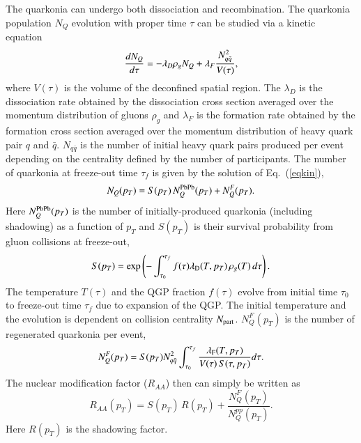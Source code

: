 {\color{black}
  The quarkonia can undergo both dissociation and recombination.
 The quarkonia population $N_{Q}$ evolution with proper time $\tau$ can be studied via
a kinetic equation~\cite{Thews:2000rj}
  \begin{equation}\label{eqkin}
    {dN_{Q} \over d\tau}  =  - \lambda_D  \rho_g N_{Q} + \lambda_F {N_{q \bar{q}}^{2} \over V(\tau)},
  \end{equation}
  where $V(\tau)$ is the volume of the deconfined spatial region.
The $\lambda_{D}$ is the dissociation rate obtained by the dissociation cross section averaged over 
the momentum distribution of gluons $\rho_g$ and $\lambda_{F}$ is the formation
rate obtained by the formation cross section 
averaged over the momentum distribution of heavy quark pair $q$ and $\bar{q}$. 
$N_{q \bar{q}}$ is the number of initial heavy quark pairs produced per event depending on the
centrality defined by the number of participants.
  The number of quarkonia at freeze-out time $\tau_f$ is given by the solution of Eq.~(\ref{eqkin}),
  \begin{equation}
    N_{Q}(p_T) = S(p_T) \,N_{Q}^{\rm PbPb}(p_T)+N_{Q}^F(p_T).
    \label{eqbeta}
  \end{equation}
  Here $N_{Q}^{\rm PbPb}(p_T)$ is the number of initially-produced quarkonia (including shadowing)
  as a function of $p_T$ and $S(p_T)$ is their survival probability from gluon collisions at freeze-out, 
  \begin{equation}
    S(p_T) = \exp \left( {-\int_{\tau_0}^{\tau_f}f(\tau) \lambda_{\rm D}(T,p_T)\,\rho_g(T)\,d\tau} \right).
  \end{equation}
  The temperature $T(\tau)$ and the QGP fraction $f(\tau)$ evolve from initial time $\tau_0$ 
  to freeze-out time $\tau_f$ due to expansion of the QGP. The initial temperature and the 
  evolution is dependent on collision centrality $N_{\rm part}$.
  $N_{Q}^F(p_T)$ is the number of regenerated quarkonia per event,
  \begin{equation}
    N_{Q}^F(p_T)=S(p_T)N_{q \bar{q}}^{2} \int_{\tau_0}^{\tau_f}{{\lambda_{\mathrm{F}}(T,p_T) \over V(\tau)\,S(\tau,p_T)} d\tau}.
  \end{equation}
  The nuclear modification factor ($R_{AA}$) then can simply be written as~\cite{Kumar:2014kfa, Kumar:2019xdj}
  \begin{equation}
    R_{AA}(p_T)=S(p_T) \, R(p_T) + \frac{N_{Q}^F(p_T)}{N_{Q}^{pp}(p_T)}.
    \label{raa}
  \end{equation}
  Here $R(p_T)$ is the shadowing factor.

}
